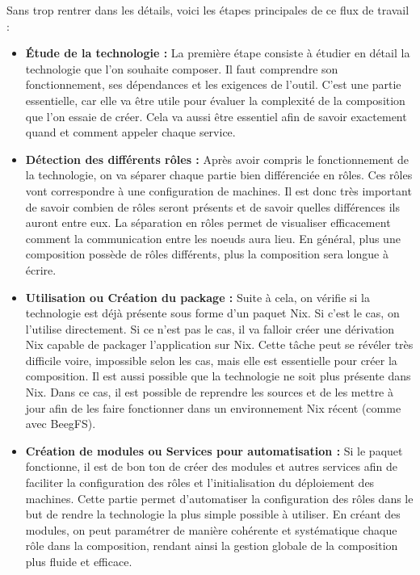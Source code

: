 \documentclass[a4paper,french,12pt, titlepage]{article}
\begin{document}
Sans trop rentrer dans les détails, voici les étapes principales de ce
flux de travail :

\begin{itemize}
\item
  \textbf{Étude de la technologie :} La première étape consiste à
  étudier en détail la technologie que l'on souhaite composer. Il faut
  comprendre son fonctionnement, ses dépendances et les exigences de
  l'outil. C'est une partie essentielle, car elle va être utile pour
  évaluer la complexité de la composition que l'on essaie de créer. Cela
  va aussi être essentiel afin de savoir exactement quand et comment
  appeler chaque service.
\item
  \textbf{Détection des différents rôles :} Après avoir compris le
  fonctionnement de la technologie, on va séparer chaque partie bien
  différenciée en rôles. Ces rôles vont correspondre à une configuration
  de machines. Il est donc très important de savoir combien de rôles
  seront présents et de savoir quelles différences ils auront entre eux.
  La séparation en rôles permet de visualiser efficacement comment la
  communication entre les noeuds aura lieu. En général, plus une
  composition possède de rôles différents, plus la composition sera
  longue à écrire.
\item
  \textbf{Utilisation ou Création du package :} Suite à cela, on vérifie
  si la technologie est déjà présente sous forme d'un paquet Nix. Si
  c'est le cas, on l'utilise directement. Si ce n'est pas le cas, il va
  falloir créer une dérivation Nix capable de packager l'application sur
  Nix. Cette tâche peut se révéler très difficile voire, impossible
  selon les cas, mais elle est essentielle pour créer la composition. Il
  est aussi possible que la technologie ne soit plus présente dans Nix.
  Dans ce cas, il est possible de reprendre les sources et de les mettre
  à jour afin de les faire fonctionner dans un environnement Nix récent
  (comme avec BeegFS).
\item
  \textbf{Création de modules ou Services pour automatisation :} Si le
  paquet fonctionne, il est de bon ton de créer des modules et autres
  services afin de faciliter la configuration des rôles et
  l'initialisation du déploiement des machines. Cette partie permet
  d'automatiser la configuration des rôles dans le but de rendre la
  technologie la plus simple possible à utiliser. En créant des modules,
  on peut paramétrer de manière cohérente et systématique chaque rôle
  dans la composition, rendant ainsi la gestion globale de la
  composition plus fluide et efficace.

\end{itemize}
\end{document}
